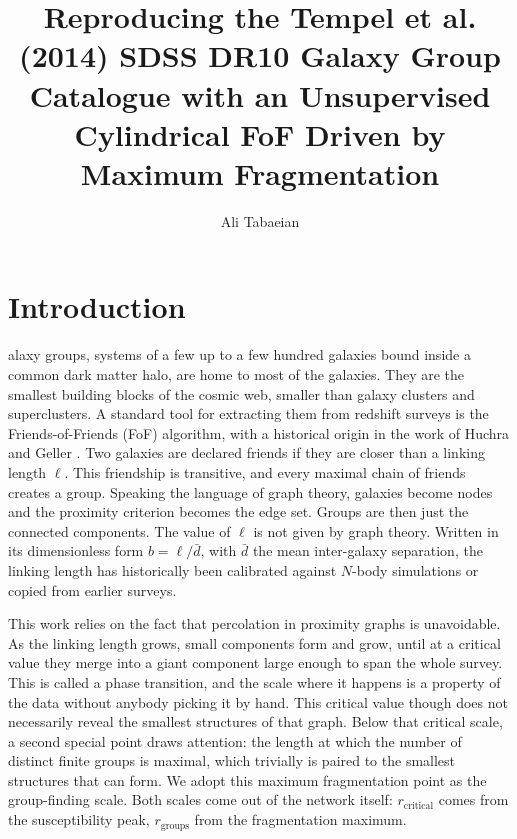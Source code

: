 \documentclass[9pt,a4paper,twocolumn,twoside]{rho-class/rho}
\title{Reproducing the Tempel et al. (2014) SDSS DR10 Galaxy Group Catalogue with an Unsupervised Cylindrical FoF Driven by\\ Maximum Fragmentation}
\author[{\textasteriskcentered},a]{Ali Tabaeian}
\affil[a]{Dipartimento di Fisica \& Astronomia, Università di Bologna}
\begin{document}
\maketitle
\thispagestyle{firststyle}

\raggedbottom
\afterpage{\flushbottom}


\section{Introduction}

alaxy groups, systems of a few up to a few hundred galaxies bound
inside a common dark matter halo, are home to most of the galaxies. They are
the smallest building blocks of the cosmic web, smaller than galaxy clusters and
superclusters.
A standard tool for extracting them from redshift surveys is the
Friends-of-Friends (FoF) algorithm, with a historical origin in the work of
Huchra and Geller \cite{huchra1982}. Two galaxies are declared friends if they are
closer than a linking length $\ell$.
This friendship is transitive, and every maximal chain of friends creates a group.
Speaking the language of graph theory, galaxies become nodes and the proximity criterion
becomes the edge set. Groups are then just
the connected components. The value of $\ell$ is not given by graph theory.
Written in its dimensionless form $b
= \ell/\bar d$, with $\bar d$ the mean inter-galaxy separation, the linking
length has historically been calibrated against $N$-body simulations
\cite{davis1985, berlind2002} or copied from earlier surveys.

This work relies on the fact that percolation in proximity graphs is unavoidable.
As the linking length grows,
small components form and grow, until at a critical value they
merge into a giant component large enough to span the whole survey. This is called a phase
transition, and the scale where it happens is a property of the data without anybody
picking it by hand. This critical value though does not necessarily reveal the smallest
structures of that graph. Below that critical scale, a second special point draws attention:
the length at which the number of distinct finite groups is maximal, which trivially
is paired to the smallest structures that can form. We adopt this maximum
fragmentation point as the group-finding scale. Both scales come out of the
network itself: $r_{\mathrm{critical}}$ comes from the susceptibility peak,
$r_{\mathrm{groups}}$ from the fragmentation maximum.
\end{document}
